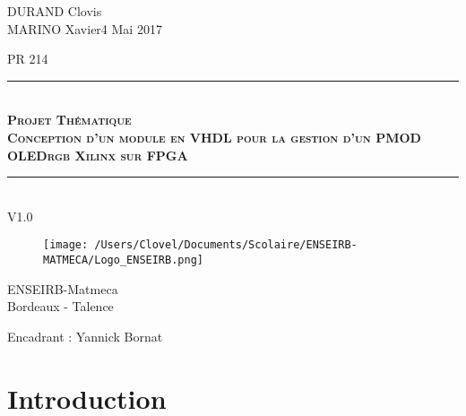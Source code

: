 \documentclass[11pt]{article}
\newcommand{\HRule}{\rule{\linewidth}{0.5mm}}
\begin{document}
\thispagestyle{empty}

\noindent 
DURAND Clovis \\ MARINO Xavier\hfill{4 Mai 2017}



\vspace{2cm}
\begin{center}
\Large{PR 214} %
\HRule \\[0.1cm]
{\textsc{\LARGE \textbf{Projet Thématique\\ Conception d'un module en VHDL pour la gestion d'un PMOD OLEDrgb Xilinx sur FPGA}}}\\
\HRule\\[01cm]
\Large{V1.0} %
\end{center}
\vspace{1,5cm}

\begin{figure}[htbp]
\begin{center}
\texttt{[image: /Users/Clovel/Documents/Scolaire/ENSEIRB-MATMECA/Logo\_ENSEIRB.png]}
\end{center}
\end{figure}

\vspace{1cm}
\begin{center}
\Large{ENSEIRB-Matmeca \\ Bordeaux - Talence}
\end{center}

\vspace{1cm}
Encadrant : Yannick Bornat

\newpage
\tableofcontents
\listoffigures
\newpage 


\section{Introduction}
\end{document}
